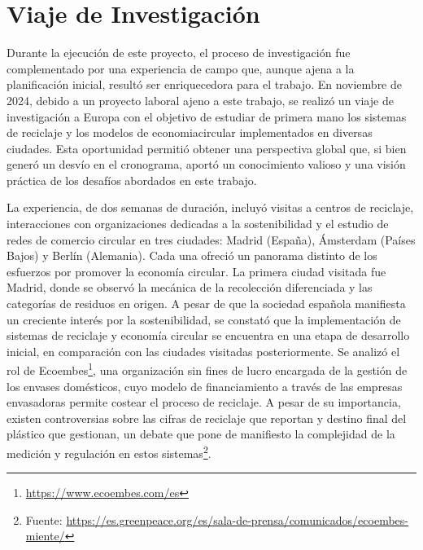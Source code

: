 \chapter[Viaje de investigación]{Viaje de Investigación}
\label{cp:europe-trip}

Durante la ejecución de este proyecto, el proceso de investigación fue complementado por una experiencia de campo que, aunque ajena a la planificación inicial, resultó ser enriquecedora para el trabajo. En noviembre de 2024, debido a un proyecto laboral ajeno a este trabajo, se realizó un viaje de investigación a Europa con el objetivo de estudiar de primera mano los sistemas de reciclaje y los modelos de \gls{economiacircular} implementados en diversas ciudades. Esta oportunidad permitió obtener una perspectiva global que, si bien generó un desvío en el cronograma, aportó un conocimiento valioso y una visión práctica de los desafíos abordados en este trabajo.

La experiencia, de dos semanas de duración, incluyó visitas a centros de reciclaje, interacciones con organizaciones dedicadas a la \gls{sostenibilidad} y el estudio de redes de comercio circular en tres ciudades: Madrid (España), Ámsterdam (Países Bajos) y Berlín (Alemania). Cada una ofreció un panorama distinto de los esfuerzos por promover la economía circular. La primera ciudad visitada fue Madrid, donde se observó la mecánica de la recolección diferenciada y las categorías de residuos en origen. A pesar de que la sociedad española manifiesta un creciente interés por la sostenibilidad, se constató que la implementación de sistemas de reciclaje y economía circular se encuentra en una etapa de desarrollo inicial, en comparación con las ciudades visitadas posteriormente. Se analizó el rol de Ecoembes\footnote{\url{https://www.ecoembes.com/es}}, una organización sin fines de lucro encargada de la gestión de los envases domésticos, cuyo modelo de financiamiento a través de las empresas envasadoras permite costear el proceso de reciclaje. A pesar de su importancia, existen controversias sobre las cifras de reciclaje que reportan y destino final del plástico que gestionan, un debate que pone de manifiesto la complejidad de la medición y regulación en estos sistemas\footnote{Fuente: \url{https://es.greenpeace.org/es/sala-de-prensa/comunicados/ecoembes-miente/}}.

